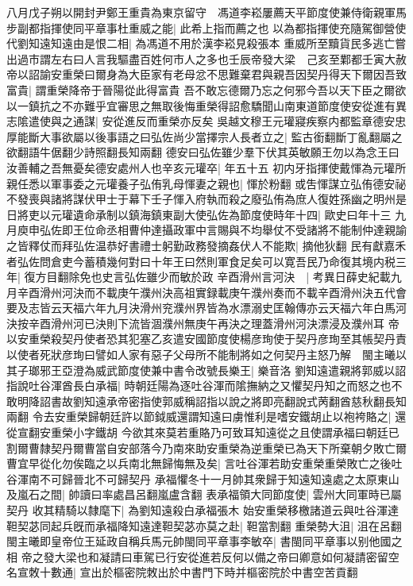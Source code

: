 八月戊子朔以開封尹鄭王重貴為東京留守　馮道李崧屢薦天平節度使兼侍衛親軍馬步副都指揮使同平章事杜重威之能|{
	此希上指而薦之也}
以為都指揮使充隨駕御營使代劉知遠知遠由是恨二相|{
	為馮道不用於漢李崧見殺張本}
重威所至黷貨民多逃亡嘗出過市謂左右曰人言我驅盡百姓何市人之多也壬辰帝發大梁　己亥至鄴都壬寅大赦帝以詔諭安重榮曰爾身為大臣家有老母忿不思難棄君與親吾因契丹得天下爾因吾致富貴|{
	謂重榮降帝于晉陽從此得富貴}
吾不敢忘德爾乃忘之何邪今吾以天下臣之爾欲以一鎮抗之不亦難乎宜審思之無取後悔重榮得詔愈驕聞山南東道節度使安從進有異志隂遣使與之通謀|{
	安從進反而重榮亦反矣}
吳越文穆王元瓘寢疾察内都監章德安忠厚能斷大事欲屬以後事語之曰弘佐尚少當擇宗人長者立之|{
	監古銜翻斷丁亂翻屬之欲翻語牛倨翻少詩照翻長知兩翻}
德安曰弘佐雖少羣下伏其英敏願王勿以為念王曰汝善輔之吾無憂矣德安處州人也辛亥元瓘卒|{
	年五十五}
初内牙指揮使戴惲為元瓘所親任悉以軍事委之元瓘養子弘侑乳母惲妻之親也|{
	惲於粉翻}
或吿惲謀立弘侑德安祕不發喪與諸將謀伏甲士于幕下壬子惲入府執而殺之廢弘侑為庶人復姓孫幽之明州是日將吏以元瓘遺命承制以鎮海鎮東副大使弘佐為節度使時年十四|{
	歐史曰年十三}
九月庾申弘佐即王位命丞相曹仲達攝政軍中言賜與不均舉仗不受諸將不能制仲達親諭之皆釋仗而拜弘佐温恭好書禮士躬勤政務發摘姦伏人不能欺|{
	摘他狄翻}
民有獻嘉禾者弘佐問倉吏今蓄積幾何對曰十年王曰然則軍食足矣可以寛吾民乃命復其境内税三年|{
	復方目翻除免也史言弘佐雖少而敏於政}
辛酉滑州言河決　|{
	考異日薛史紀載九月辛酉滑州河決而不載庚午濮州決高祖實録載庚午濮州奏而不載辛酉滑州決五代會要及志皆云天福六年九月決滑州兖濮州界皆為水漂溺史匡翰傳亦云天福六年白馬河決按辛酉滑州河已決則下流皆涸濮州無庚午再決之理蓋滑州河決漂浸及濮州耳}
帝以安重榮殺契丹使者恐其犯塞乙亥遣安國節度使楊彦珣使于契丹彦珣至其帳契丹責以使者死狀彦珣曰譬如人家有惡子父母所不能制將如之何契丹主怒乃解　閩主曦以其子瑯邪王亞澄為威武節度使兼中書令改號長樂王|{
	樂音洛}
劉知遠遣親將郭威以詔指說吐谷渾酋長白承福|{
	時朝廷陽為逐吐谷渾而隂撫納之又懼契丹知之而怒之也不敢明降詔書故劉知遠承帝密指使郭威稱詔指以說之將即亮翻說式苪翻酋慈秋翻長知兩翻}
令去安重榮歸朝廷許以節鉞威還謂知遠曰虜惟利是嗜安鐵胡止以袍袴賂之|{
	還從宣翻安重榮小字鐵胡}
今欲其來莫若重賂乃可致耳知遠從之且使謂承福曰朝廷已割爾曹隸契丹爾曹當自安部落今乃南來助安重榮為逆重榮已為天下所棄朝夕敗亡爾曹宜早從化勿俟臨之以兵南北無歸悔無及矣|{
	言吐谷渾若助安重榮重榮敗亡之後吐谷渾南不可歸晉北不可歸契丹}
承福懼冬十一月帥其衆歸于知遠知遠處之太原東山及嵐石之間|{
	帥讀曰率處昌呂翻嵐盧含翻}
表承福領大同節度使|{
	雲州大同軍時已屬契丹}
收其精騎以隸麾下|{
	為劉知遠殺白承福張木}
始安重榮移檄諸道云與吐谷渾達靼契苾同起兵旣而承福降知遠達靼契苾亦莫之赴|{
	靼當割翻}
重榮勢大沮|{
	沮在呂翻}
閩主曦即皇帝位王延政自稱兵馬元帥閩同平章事李敏卒|{
	書閩同平章事以别他國之相}
帝之發大梁也和凝請曰車駕已行安從進若反何以備之帝曰卿意如何凝請密留空名宣敇十數通|{
	宣出於樞密院敇出於中書門下時并樞密院於中書空苦貢翻}
